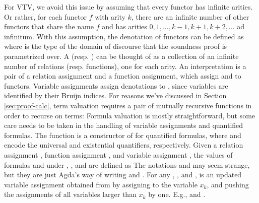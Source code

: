\documentclass[12pt]{article}
\begin{document}
For VTV, we avoid this issue by assuming that every functor has infinite arities.
Or rather, for each functor $f$ with arity $k$, there are an infinite number 
of other functors that share the name $f$ and has arities $0, 1, ..., k-1, k+1, k+2, ...$ 
ad infinitum. With this assumption, the denotation of functors can be defined as 
where  is the type of the domain of discourse that the 
soundness proof is parametrized over.
A  (resp. ) can be thought of as a 
collection of an infinite number of relations (resp. functions), one for 
each arity. An interpretation is a pair of a relation assignment and a 
function assignment, which assign  and  
to functors.
Variable assignments assign denotations to , since variables are 
identified by their Bruijn indices.
For reasons we've discussed in Section \ref{sec:proof-calc}, term valuation 
requires a pair of mutually recursive functions in order to recurse on terms:
Formula valuation is mostly straightforward, but some care needs to be taken 
in the handling of variable assignments and quantified formulas. 
The function  \AgdaSymbol{:}      
is a constructor of  for quantified formulas, where 
  and
  encode the universal and existential quantifiers, respectively.
Given a relation assignment ,
function assignment   , and
variable assignment   ,
the values of formulas 
   and
   under
, , and  are defined as
The notations 
    and
    
may seem strange, but they are just Agda's way of writing 
   and 
  .
For any , , and , 
\AgdaSymbol{(} \AgdaFunction{/}   \AgdaSymbol{)} 
is an updated variable assignment obtained from  by assigning 
 to the variable $x_k$, and pushing the assignments of all variables 
larger than $x_k$ by one.
E.g., \AgdaSymbol{(} 
\AgdaFunction{/}   \AgdaSymbol{)}
 \AgdaSymbol{=}  
and 
\AgdaSymbol{(} 
\AgdaFunction{/}   \AgdaSymbol{)} 
\AgdaSymbol{(} \AgdaSymbol{)} \AgdaSymbol{=}  .
\end{document}
